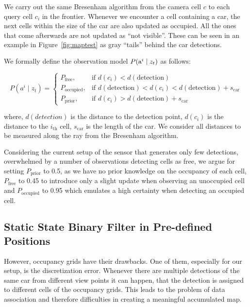 We carry out the same Bresenham algorithm from the camera cell $c$ to each
query cell $c_i$ in the frontier. Whenever we encounter a cell containing a
car, the next cells within the size of the car are also updated as occupied.
All the ones that come afterwards are not updated as ``not visible''. These
can be seen in an example in Figure~\ref{fig:maptest} as gray ``tails'' behind
the car detections.

We formally define the observation model $P({\mbox{a}^i} \mid z_t)$ as follows:

\begin{equation}
\label{eq:observation_model}
P(a^i \mid z_t) = \begin{cases} P_{\mathrm{free}}, & \mbox{if } d(c_i) < d(\mathrm{detection}) \\ P_{\mathrm{occupied}}, & \mbox{if } d(\mathrm{detection}) < d(c_i) < d(\mathrm{detection}) + s_{\mathrm{car}} \\ P_{\mathrm{prior}}, & \mbox{if } d(c_i) > d(\mathrm{detection}) + s_{\mathrm{car}} \end{cases}
\end{equation}

where, $d(detection)$ is the distance to the detection point, $d(c_i)$ is the
distance to the $i_\mathrm{th}$ cell, $s_\mathrm{car}$ is the length of the car. We consider
all distances to be measured along the ray from the Bresenham algorithm.

Considering the current setup of the sensor that generates only few
detections, overwhelmed by a number of observations detecting cells as free,
we argue for setting $P_{\mathrm{prior}}$ to 0.5, as we have no prior
knowledge on the occupancy of each cell, $P_{\mathrm{free}}$ to 0.45 to
introduce only a slight update when observing an unoccupied cell and
$P_{\mathrm{occupied}}$ to 0.95 which emulates a high certainty when detecting
an occupied cell.


\subsection{Static State Binary Filter in Pre-defined Positions}
\label{sub:static_state_binary_filter_in_pre_defined_positions}

However, occupancy grids have their drawbacks. One of them, especially for our
setup, is the discretization error. Whenever there are multiple detections of
the same car from different view points it can happen, that the detection is
assigned to different cells of the occupancy grids. This leads to the problem
of data association and therefore difficulties in creating a meaningful
accumulated map.

